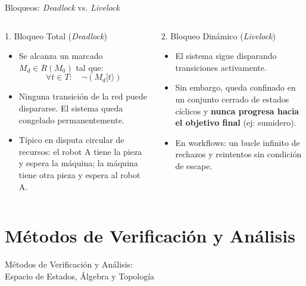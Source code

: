 \documentclass[10pt, aspectratio=169]{beamer}
\begin{document}
\begin{frame}{Bloqueos: \emph{Deadlock} vs. \emph{Livelock}}
	\begin{columns}
		\begin{alertblock}{1. Bloqueo Total (\emph{Deadlock})}
			\begin{itemize}
				\item Se alcanza un marcado $M_d \in R(M_0)$ tal que:
				\[ \forall t \in T: \quad \neg (M_d [t\rangle) \]
				\item Ninguna transición de la red puede dispararse. El sistema queda congelado permanentemente.
				\item Típico en disputa circular de recursos: el robot A tiene la pieza y espera la máquina; la máquina tiene otra pieza y espera al robot A.
			\end{itemize}
		\end{alertblock}

		\begin{block}{2. Bloqueo Dinámico (\emph{Livelock})}
			\begin{itemize}
				\item El sistema sigue disparando transiciones activamente.
				\item Sin embargo, queda confinado en un conjunto cerrado de estados cíclicos y \textbf{nunca progresa hacia el objetivo final} (ej: sumidero).
				\item En workflows: un bucle infinito de rechazos y reintentos sin condición de escape.
			\end{itemize}
		\end{block}
	\end{columns}
\end{frame}

\section{Métodos de Verificación y Análisis}

\begin{frame}{}
	\centering
	\Huge{Métodos de Verificación y Análisis: \\ Espacio de Estados, Álgebra y Topología}
\end{frame}
\end{document}
